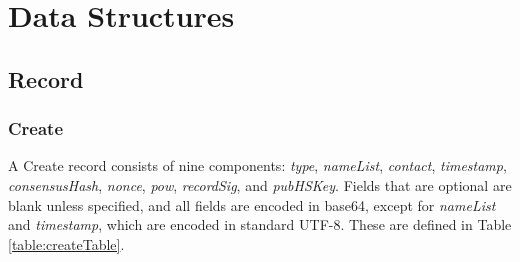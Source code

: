 \section{Data Structures}

\subsection{Record}
\label{sec:Record}



\subsubsection{Create}

A Create record consists of nine components: \emph{type}, \emph{nameList}, \emph{contact}, \emph{timestamp}, \emph{consensusHash}, \emph{nonce}, \emph{pow}, \emph{recordSig}, and \emph{pubHSKey}. Fields that are optional are blank unless specified, and all fields are encoded in base64, except for \emph{nameList} and \emph{timestamp}, which are encoded in standard UTF-8. These are defined in Table \ref{table:createTable}.

